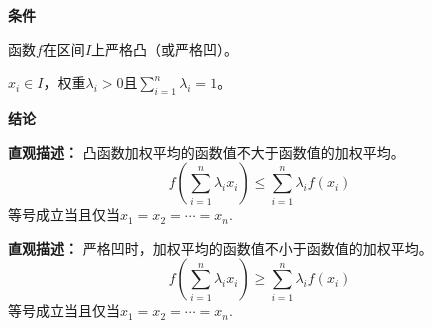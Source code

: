 \begin{statementbox}
	\textbf{\textcolor{CStatement}{条件}}
	\begin{description}[style=nextline, leftmargin=2.8em, labelsep=0.5em, itemsep=0.35em]
		\item[\textbf{\textcolor{CStatement}{条件1（凸性条件）：}}] 函数$f$在区间$I$上严格凸（或严格凹）。
		\item[\textbf{\textcolor{CStatement}{条件2（变量条件）：}}] $x_i\in I$，权重$\lambda_i>0$且$\sum_{i=1}^n\lambda_i=1$。
	\end{description}

	\textbf{\textcolor{CStatement}{结论}}
	\begin{description}[style=nextline, leftmargin=2.8em, labelsep=0.5em, itemsep=0.45em]
		\item[\textbf{\textcolor{CStatement}{结论一（琴生不等式）：}}]
			\textbf{\textcolor{CStatement}{直观描述：}}
			凸函数加权平均的函数值不大于函数值的加权平均。
			\[
				f\!\left(\sum_{i=1}^n\lambda_i x_i\right)\le\sum_{i=1}^n\lambda_i f(x_i)
			\]
			等号成立当且仅当$x_1=x_2=\cdots=x_n$.

		\item[\textbf{\textcolor{CStatement}{推广结论（严格凹情形）：}}]
			\textbf{\textcolor{CStatement}{直观描述：}}
			严格凹时，加权平均的函数值不小于函数值的加权平均。
			\[
				f\!\left(\sum_{i=1}^n\lambda_i x_i\right)\ge\sum_{i=1}^n\lambda_i f(x_i)
			\]
			等号成立当且仅当$x_1=x_2=\cdots=x_n$.
	\end{description}
\end{statementbox}
